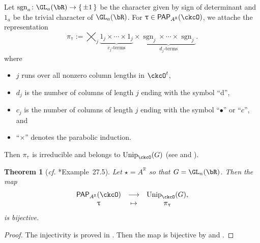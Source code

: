 \documentclass[12pt,a4paper]{amsart}
\newcommand{\sgn}{\operatorname{sgn}}
\newcommand{\R}{\mathbb R}
\numberwithin{equation}{section}
\newtheorem{thm}{Theorem}[section]
\theoremstyle{remark}
\def\cf{\emph{cf.} }
\def\Unip{\mathrm{Unip}}
\def\ckG{\check{G}}
\def\PP{\mathsf{PAP}}
\begin{document}
Let $\sgn_a\colon \GL_a(\bR)\rightarrow \set{\pm 1}$ be the character given by sign of determinant
and $1_a$ be the trivial character of $\GL_a(\bR)$.
For
$\uptau\in \PP_{A^\R}(\ckcO)$, we attache the representation
\begin{equation}\label{eq:u.GLR}
  \pi_\uptau :=
  \bigtimes_{j} \underbrace{1_j \times \cdots \times 1_j}_{c_j\text{-terms}}\times
  \underbrace{\sgn_j \times \cdots \times {\sgn_j} }_{d_j\text{-terms}}.
\end{equation}
where
\begin{itemize}
  \item $j$ runs over all nonzero column lengths in $\ckcO^t$,
  \item $d_j$ is the number of columns of length $j$ ending with the symbol
        ``d'',
  \item $c_j$ is the number of columns of length $j$ ending with the symbol
        ``$\bullet$'' or ``$c$'', and
  \item ``$\times$'' denotes the parabolic induction.
\end{itemize}
Then $\pi_{\uptau}$ is irreducible and belongs to $\Unip_{\ckcO}(G)$ (see  \cite[Theorem 3.8]{V.GL} and \cite[Example~27.5]{ABV}).

\begin{thm}[\cf \cite{ABV}*{Example~27.5}] \label{thm:mainR} Let $\star =A^\R$ so that $G =\GL_n(\bR)$. Then the map
  \[
    \begin{array}{ccc}
      \PP_{A^\R}(\ckcO) & \longrightarrow & \Unip_{\ckcO}(G),\\
      \uptau & \mapsto & \pi_{\uptau}
    \end{array}
  \]
  is bijective.
\end{thm}
\begin{proof}
  The injectivity is proved in  \cite[Theorem 3.8]{V.GL}.
Then   the map is bijective by  and .
\end{proof}

\end{document}
